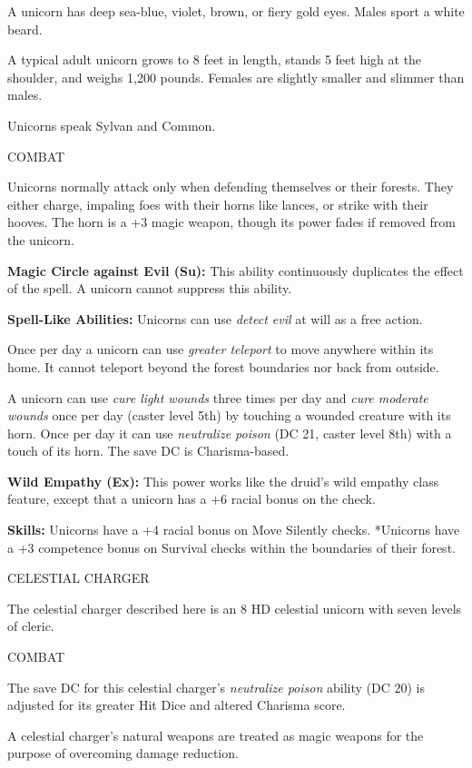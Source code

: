 \documentclass{article}
\begin{document}
A unicorn has deep sea-blue, violet, brown, or fiery gold eyes. Males sport a white 
beard.

A typical adult unicorn grows to 8 feet in length, stands 5 feet high at the shoulder, 
and weighs 1,200 pounds. Females are slightly smaller and slimmer than males.

Unicorns speak Sylvan and Common.

COMBAT

Unicorns normally attack only when defending themselves or their forests. They 
either charge, impaling foes with their horns like lances, or strike with their 
hooves. The horn is a +3 magic weapon, though its power fades if removed from the 
unicorn.

\textbf{Magic Circle against Evil (Su): }This ability continuously duplicates the 
effect of the spell. A unicorn cannot suppress this ability.

\textbf{Spell-Like Abilities: }Unicorns can use \textit{detect evil }at will as 
a free action.

Once per day a unicorn can use \textit{greater teleport }to move anywhere within 
its home. It cannot teleport beyond the forest boundaries nor back from outside.

A unicorn can use \textit{cure light wounds }three times per day and \textit{cure 
moderate wounds }once per day (caster level 5th) by touching a wounded creature 
with its horn. Once per day it can use \textit{neutralize poison }(DC 21, caster 
level 8th) with a touch of its horn. The save DC is Charisma-based.

\textbf{Wild Empathy (Ex): }This power works like the druid's wild empathy class 
feature, except that a unicorn has a +6 racial bonus on the check.

\textbf{Skills:} Unicorns have a +4 racial bonus on Move Silently checks. *Unicorns 
have a +3 competence bonus on Survival checks within the boundaries of their forest.

\vspace{12pt}
CELESTIAL CHARGER

The celestial charger described here is an 8 HD celestial unicorn with seven levels 
of cleric.

COMBAT

The save DC for this celestial charger's \textit{neutralize poison }ability (DC 
20) is adjusted for its greater Hit Dice and altered Charisma score. 

A celestial charger's natural weapons are treated as magic weapons for the purpose 
of overcoming damage reduction.
\end{document}
